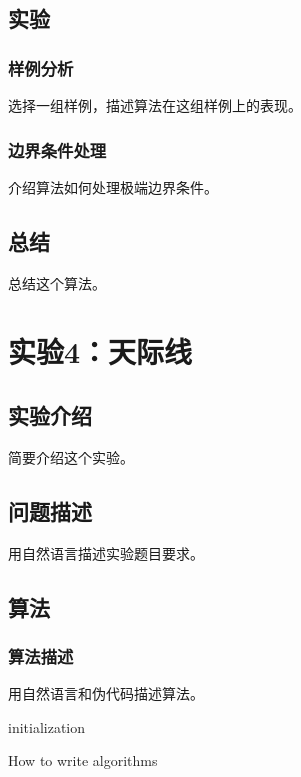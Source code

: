 \documentclass{ctexrep}
\begin{document}
\section{实验}
\subsection{样例分析}
选择一组样例，描述算法在这组样例上的表现。
\subsection{边界条件处理}
介绍算法如何处理极端边界条件。

\section{总结}
总结这个算法。

\chapter{实验4：天际线}
\section{实验介绍}
简要介绍这个实验。

\section{问题描述}
用自然语言描述实验题目要求。

\section{算法}
\subsection{算法描述}
用自然语言和伪代码描述算法。
\begin{algorithm}
\SetAlgoLined
{}
 initialization\;
 \caption{How to write algorithms}
\end{algorithm}
\end{document}
